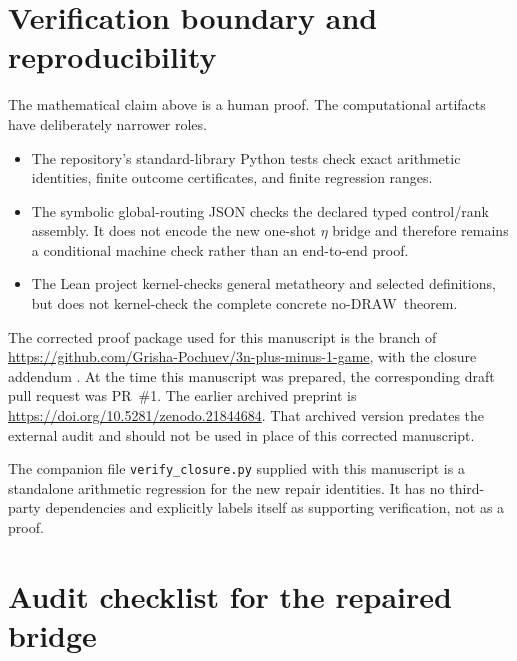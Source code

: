 \documentclass[11pt]{article}
\newcommand{\DRAW}{\ensuremath{\mathrm{DRAW}}}
\begin{document}
\section{Verification boundary and reproducibility}\label{sec:repro}

The mathematical claim above is a human proof. The computational artifacts
have deliberately narrower roles.

\begin{itemize}
\item The repository's standard-library Python tests check exact arithmetic
      identities, finite outcome certificates, and finite regression ranges.
\item The symbolic global-routing JSON checks the declared typed control/rank
      assembly. It does not encode the new one-shot $\eta$ bridge and therefore
      remains a conditional machine check rather than an end-to-end proof.
\item The Lean project kernel-checks general metatheory and selected definitions,
      but does not kernel-check the complete concrete no-\DRAW\ theorem.
\end{itemize}

The corrected proof package used for this manuscript is the branch
 of
\url{https://github.com/Grisha-Pochuev/3n-plus-minus-1-game},
with the closure addendum . At the time
this manuscript was prepared, the corresponding draft pull request was PR~\#1.
The earlier archived preprint is
\url{https://doi.org/10.5281/zenodo.21844684}.
That archived version predates the external audit and should not be used in
place of this corrected manuscript.

The companion file \texttt{verify\_closure.py} supplied with this manuscript
is a standalone arithmetic regression for the new repair identities. It has
no third-party dependencies and explicitly labels itself as supporting
verification, not as a proof.

\section{Audit checklist for the repaired bridge}
\end{document}
